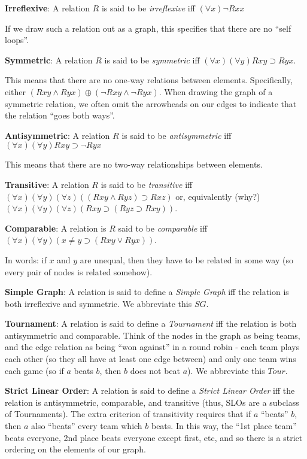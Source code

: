 \begin{mdframed}[linewidth=1]
\textbf{Irreflexive}: A relation $R$ is said to be \emph{irreflexive} iff $(\forall x)\lnot Rxx$

If we draw such a relation out as a graph, this specifies that there are no ``self loops''. 

\textbf{Symmetric}: A relation $R$ is said to be \emph{symmetric} iff $(\forall x)(\forall y)Rxy \supset Ryx$.

This means that there are no one-way relations between elements. Specifically, either $(Rxy \land Ryx) \oplus (\lnot Rxy \land \lnot Ryx)$. When drawing the graph of a symmetric relation, we often omit the arrowheads on our edges to indicate that the relation ``goes both ways''. 

\textbf{Antisymmetric}: A relation $R$ is said to be \emph{antisymmetric} iff $(\forall x)(\forall y)Rxy \supset \lnot Ryx$

This means that there are no two-way relationships between elements. 

\textbf{Transitive}: A relation $R$ is said to be \emph{transitive} iff $(\forall x)(\forall y)(\forall z)((Rxy \land Ryz) \supset Rxz)$ or, equivalently (why?) $(\forall x)(\forall y)(\forall z)(Rxy \supset (Ryz \supset Rxy))$.

\textbf{Comparable}: A relation is $R$ said to be \emph{comparable} iff $(\forall x)(\forall y)(x \neq y \supset (Rxy \vee Ryx))$. 

In words: if $x$ and $y$ are unequal, then they have to be related in some way (so every pair of nodes is related somehow). 

\textbf{Simple Graph}: A relation is said to define a \emph{Simple Graph} iff the relation is both irreflexive and symmetric. We abbreviate this $SG$. 

\textbf{Tournament}: A relation is said to define a \emph{Tournament} iff the relation is both antisymmetric and comparable. Think of the nodes in the graph as being teams, and the edge relation as being ``won against'' in a round robin - each team plays each other (so they all have at least one edge between) and only one team wins each game (so if $a$ beats $b$, then $b$ does not beat $a$). We abbreviate this $Tour$. 

\textbf{Strict Linear Order}: A relation is said to define a \emph{Strict Linear Order} iff the relation is antisymmetric, comparable, and transitive (thus, SLOs are a subclass of Tournaments). The extra criterion of transitivity requires that if $a$ ``beats'' $b$, then $a$ also ``beats'' every team which $b$ beats. In this way, the ``1st place team'' beats everyone, 2nd place beats everyone except first, etc, and so there is a strict ordering on the elements of our graph. 


\end{mdframed}
